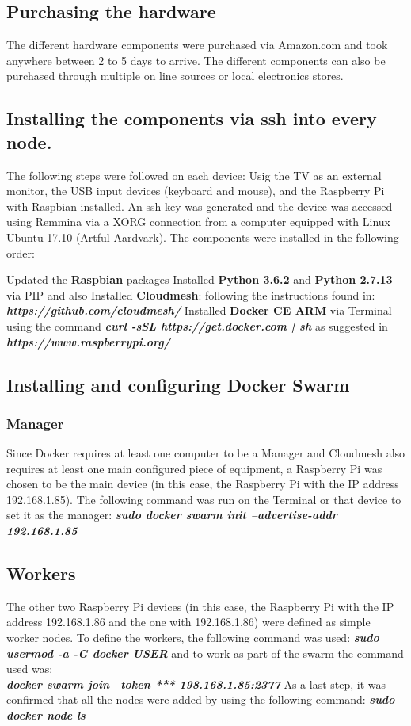 \documentclass[sigconf]{acmart}
\begin{document}
	\subsection{Purchasing the hardware}
	
	The different hardware components were purchased via Amazon.com and took anywhere between 2 to 5 days to arrive. The different components can also be purchased through multiple on line sources or local electronics stores.
		
	\subsection{Installing the components via ssh into every node.}
	
	The following steps were followed on each device:
	Usig the TV as an external monitor, the USB input devices (keyboard and mouse), and the Raspberry Pi with Raspbian installed. An ssh key was generated and the device was accessed using Remmina via a XORG connection from a computer equipped with Linux Ubuntu 17.10 (Artful Aardvark).
	The components were installed in the following order:
	
	Updated the \textbf{Raspbian} packages \textbf{\textit{}}
	Installed \textbf{Python 3.6.2} and \textbf{Python 2.7.13} via PIP and also 
	Installed \textbf{Cloudmesh}: following the instructions found in: \textbf{\textit{https://github.com/cloudmesh/}}
	Installed \textbf{Docker CE ARM} via Terminal using the command \textbf{\textit{curl -sSL https://get.docker.com | sh}}
	as suggested in\\ \textbf{\textit{https://www.raspberrypi.org/}}

	
	\subsection{Installing and configuring Docker Swarm}
	\subsubsection{Manager}
	Since Docker requires at least one computer to be a Manager and Cloudmesh also requires at least one main configured piece of equipment, a Raspberry Pi was chosen to be the main device (in this case, the Raspberry Pi with the IP address 192.168.1.85). The following command was run on the Terminal or that device to set it as the manager: \textbf{\textit{sudo docker swarm init --advertise-addr 192.168.1.85}}
	\subsection{Workers}
	The other two Raspberry Pi devices (in this case, the Raspberry Pi with the IP address 192.168.1.86 and the one with 192.168.1.86) were defined as simple worker nodes.
	To define the workers, the following command was used: \textbf{\textit{sudo usermod -a -G docker USER}} and to work as part of the swarm the command used was:\\
	 \textbf{\textit{docker swarm join --token *** 198.168.1.85:2377}}
	As a last step, it was confirmed that all the nodes were added by using the following command: 	 \textbf{\textit{sudo docker node ls}}
	
\end{document}
